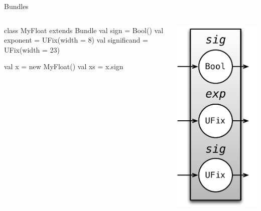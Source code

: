 \documentclass[xcolor=pdflatex,dvipsnames,table]{beamer}
\begin{document}
\begin{frame}[fragile]{Bundles}

\begin{columns}
\begin{scala}
class MyFloat extends Bundle {
  val sign        = Bool()
  val exponent    = UFix(width = 8)
  val significand = UFix(width = 23)
}

val x  = new MyFloat()
val xs = x.sign
\end{scala}


\begin{center}
\includegraphics[height=0.9\textheight]{figs/myfloat.pdf} 
\end{center}

\end{columns}
\end{frame}
\end{document}
